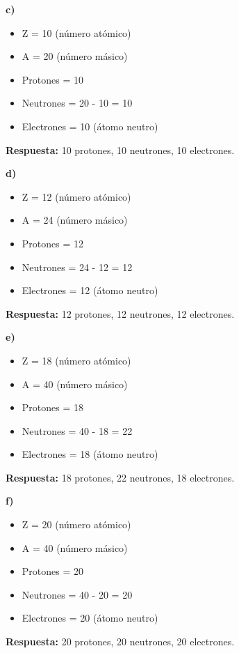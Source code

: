 \begin{exercise}
\begin{solu}
        \textbf{c) }
        \begin{itemize}
            \item Z = 10 (número atómico)
            \item A = 20 (número másico)
            \item Protones = 10
            \item Neutrones = 20 - 10 = 10
            \item Electrones = 10 (átomo neutro)
        \end{itemize}
        \textbf{Respuesta:} 10 protones, 10 neutrones, 10 electrones.

        \textbf{d) }
        \begin{itemize}
            \item Z = 12 (número atómico)
            \item A = 24 (número másico)
            \item Protones = 12
            \item Neutrones = 24 - 12 = 12
            \item Electrones = 12 (átomo neutro)
        \end{itemize}
        \textbf{Respuesta:} 12 protones, 12 neutrones, 12 electrones.

        \textbf{e) }
        \begin{itemize}
            \item Z = 18 (número atómico)
            \item A = 40 (número másico)
            \item Protones = 18
            \item Neutrones = 40 - 18 = 22
            \item Electrones = 18 (átomo neutro)
        \end{itemize}
        \textbf{Respuesta:} 18 protones, 22 neutrones, 18 electrones.

        \textbf{f) }
        \begin{itemize}
            \item Z = 20 (número atómico)
            \item A = 40 (número másico)
            \item Protones = 20
            \item Neutrones = 40 - 20 = 20
            \item Electrones = 20 (átomo neutro)
        \end{itemize}
        \textbf{Respuesta:} 20 protones, 20 neutrones, 20 electrones.
    \end{solu}
\end{exercise}

